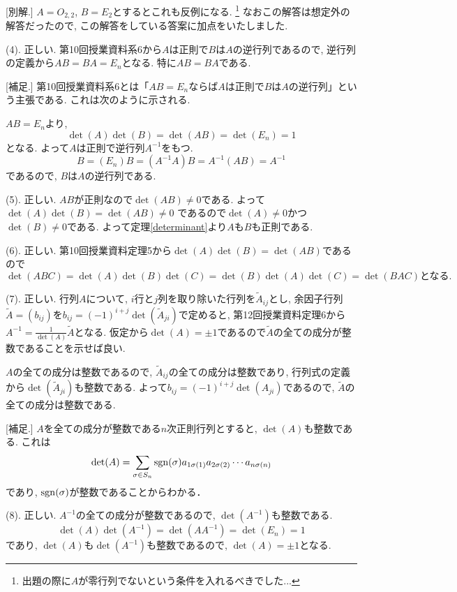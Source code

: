 \documentclass[dvipdfmx,a4paper,11pt]{article}
\newcommand{\sgn}{{\rm sgn}}
\theoremstyle{definition}
\begin{document}
[別解.] $A=O_{2,2}$, $B=E_2$とするとこれも反例になる. \footnote{出題の際に$A$が零行列でないという条件を入れるべきでした...}
なおこの解答は想定外の解答だったので, この解答をしている答案に加点をいたしました.

(4). 正しい. 第10回授業資料系6から$A$は正則で$B$は$A$の逆行列であるので, 逆行列の定義から$AB = BA =E_n$となる. 特に$AB=BA$である.

[補足.] 第10回授業資料系6とは「$AB=E_n$ならば$A$は正則で$B$は$A$の逆行列」という主張である.
 これは次のように示される.

$AB = E_n$より, 
$$
\det(A) \det (B) = \det(AB) = \det(E_n)=1
$$
となる. よって$A$は正則で逆行列$A^{-1}$をもつ. 
$$B = (E_n)B  = (A^{-1}A)B = A^{-1}(AB) = A^{-1}$$
であるので, $B$は$A$の逆行列である.
 
 (5). 正しい. 
$AB$が正則なので$\det(AB)\neq 0$である.
よって$\det(A) \det (B) = \det(AB) \neq 0$
であるので$\det (A) \neq 0$かつ$\det(B)\neq 0$である.
よって定理\ref{determinant}より$A$も$B$も正則である.

 (6). 正しい. 第10回授業資料定理5から$\det(A) \det (B) = \det(AB) $であるので
 $$
 \det(ABC)
 =
 \det(A) \det(B) \det(C)
 =
 \det(B)\det(A)\det(C)
 =
  \det(BAC)
  \text{となる.}
 $$
 
(7). 正しい.  
行列$A$について, $i$行と$j$列を取り除いた行列を$\tilde{A}_{ij}$とし, 
余因子行列$\tilde{A}=(b_{ij})$を$b_{ij}=(-1)^{i+j}\det(\tilde{A}_{ji})$で定めると, 第12回授業資料定理6から
$A^{-1} = \frac{1}{\det(A)} \tilde{A}$となる.
仮定から$\det(A ) = \pm 1$であるので$ \tilde{A}$の全ての成分が整数であることを示せば良い.

$A$の全ての成分は整数であるので, $\tilde{A}_{ij}$の全ての成分は整数であり, 行列式の定義から$\det(\tilde{A}_{ji})$も整数である.
よって$b_{ij}=(-1)^{i+j}\det(A_{ji})$であるので, $ \tilde{A}$の全ての成分は整数である.

[補足.]
$A$を全ての成分が整数である$n$次正則行列とすると, $\det(A)$も整数である.
これは
$$
\det(A) =  \sum_{\sigma \in S_n}\sgn(\sigma) 
a_{1 \sigma(1)} a_{2 \sigma(2)} \cdots a_{n \sigma(n)} 
$$
であり, $\sgn(\sigma) $が整数であることからわかる．

(8). 正しい.  
$A^{-1}$の全ての成分が整数であるので, $\det(A^{-1})$も整数である.
$$
\det(A)\det(A^{-1}) = \det(A A^{-1})=\det(E_n) = 1
$$
であり, $\det(A)$も$\det(A^{-1})$も整数であるので, $\det(A)=\pm1$となる.
 \vspace{22pt}
   
\end{document}
